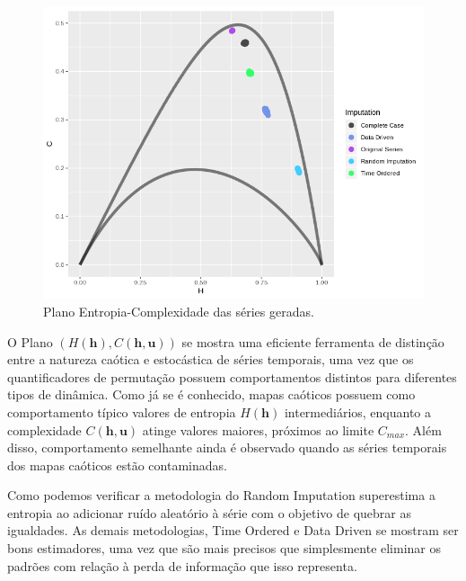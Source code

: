 \documentclass[paper=a4, fontsize=11pt]{scrartcl}
\numberwithin{equation}{section}
\numberwithin{figure}{section}
\numberwithin{table}{section}
\begin{document}
\begin{figure}[hbt]
	\centering
	\includegraphics[scale = 0.6]{hcplane.png}        
     \caption{Plano Entropia-Complexidade das séries geradas.}
     \label{fig:Plano}
\end{figure}

O Plano $(H(\bm h), C(\bm h, \bm u))$ se mostra uma eficiente ferramenta de distinção entre a natureza caótica e estocástica de séries temporais, uma vez que os quantificadores de permutação possuem comportamentos distintos para diferentes tipos de dinâmica. Como já se é conhecido, mapas caóticos possuem como comportamento típico valores de entropia $H(\bm h)$ intermediários, enquanto a complexidade $C(\bm h, \bm u)$ atinge valores maiores, próximos ao limite $C_{max}$. Além disso, comportamento semelhante ainda é observado quando as séries temporais dos mapas caóticos estão contaminadas.

Como podemos verificar a metodologia do Random Imputation superestima a entropia ao adicionar ruído aleatório à série com o objetivo de quebrar as igualdades. As demais metodologias, Time Ordered e Data Driven se mostram ser bons estimadores, uma vez que são mais precisos que simplesmente eliminar os padrões com relação à perda de informação que isso representa.
\end{document}
